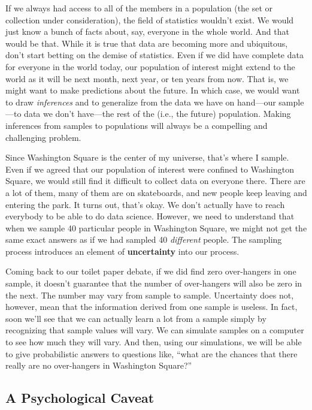 \documentclass[
  openany]{book}
\begin{document}
If we always had access to all of the members in a population (the set or collection under consideration), the field of statistics wouldn't exist. We would just know a bunch of facts about, say, everyone in the whole world. And that would be that. While it is true that data are becoming more and ubiquitous, don't start betting on the demise of statistics. Even if we did have complete data for everyone in the world today, our population of interest might extend to the world as it will be next month, next year, or ten years from now. That is, we might want to make predictions about the future. In which case, we would want to draw \emph{inferences} and to generalize from the data we have on hand---our sample---to data we don't have---the rest of the (i.e., the future) population. Making inferences from samples to populations will always be a compelling and challenging problem.

Since Washington Square is the center of my universe, that's where I sample. Even if we agreed that our population of interest were confined to Washington Square, we would still find it difficult to collect data on everyone there. There are a lot of them, many of them are on skateboards, and new people keep leaving and entering the park. It turns out, that's okay. We don't actually have to reach everybody to be able to do data science. However, we need to understand that when we sample 40 particular people in Washington Square, we might not get the same exact answers as if we had sampled 40 \emph{different} people. The sampling process introduces an element of \textbf{uncertainty} into our process.

Coming back to our toilet paper debate, if we did find zero over-hangers in one sample, it doesn't guarantee that the number of over-hangers will also be zero in the next. The number may vary from sample to sample. Uncertainty does not, however, mean that the information derived from one sample is useless. In fact, soon we'll see that we can actually learn a lot from a sample simply by recognizing that sample values will vary. We can simulate samples on a computer to see how much they will vary. And then, using our simulations, we will be able to give probabilistic answers to questions like, ``what are the chances that there really are no over-hangers in Washington Square?''

\hypertarget{a-psychological-caveat}{%
\subsection*{A Psychological Caveat}\label{a-psychological-caveat}}
\end{document}
